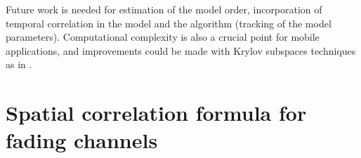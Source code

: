 \documentclass[journal,10pt]{IEEEtran}
\begin{document}
Future work is needed for estimation of the model order, incorporation of temporal correlation in the model and the algorithm (tracking of the model parameters). Computational complexity is also a crucial point for mobile applications, and improvements could be made with Krylov subspaces techniques as in \cite{Barbotin2009}.









\appendices

\section{Spatial correlation formula for fading channels}\label{sec:appendixB}
\end{document}
